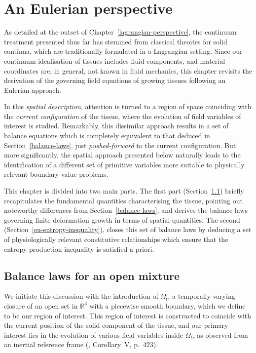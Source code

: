 \chapter{An Eulerian perspective}
\label{eulerian-perspective}

As detailed at the outset of Chapter~\ref{lagrangian-perspective}, the
continuum treatment presented thus far has stemmed from classical
theories for solid continua, which are traditionally formulated in a
Lagrangian setting. Since our continuum idealisation of tissues
includes fluid components, and material coordinates are, in general,
not known in fluid mechanics, this chapter revisits the derivation of
the governing field equations of growing tissues following an Eulerian
approach.

In this {\em spatial description}, attention is turned to a region of
space coinciding with the {\em current configuration} of the tissue,
where the evolution of field variables of interest is studied.
Remarkably, this dissimilar approach results in a set of balance
equations which is completely equivalent to that deduced in
Section~\ref{balance-laws}, just {\em pushed-forward} to the current
configuration. But more significantly, the spatial approach presented
below naturally leads to the identification of a different set of
primitive variables more suitable to physically relevant boundary
value problems.

This chapter is divided into two main parts. The first part
(Section~\ref{eu-balance-laws}) briefly recapitulates the fundamental
quantities characterising the tissue, pointing out noteworthy
differences from Section~\ref{balance-laws}, and derives the balance
laws governing finite deformation growth in terms of spatial
quantities. The second (Section~\ref{eu-entropy-inequality}), closes
this set of balance laws by deducing a set of physiologically relevant
constitutive relationships which ensure that the entropy production
inequality is satisfied a priori.

\section{Balance laws for an open mixture}
\label{eu-balance-laws}

We initiate this discussion with the introduction of $\Omega_{t}$, a
temporally-varying closure of an open set in $\mathbb{R}^{3}$ with a
piecewise smooth boundary, which we define to be our region of
interest. This region of interest is constructed to coincide with the
current position of the solid component of the tissue, and our primary
interest lies in the evolution of various field variables inside
$\Omega_{t}$, as observed from an inertial reference frame
(\citet{newton1726}, Corollary~V, p.~423).

